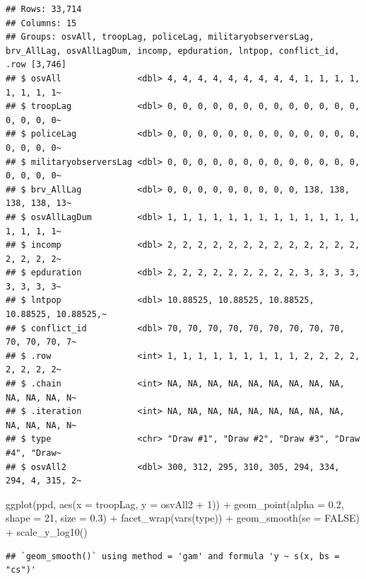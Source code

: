 \documentclass[
]{book}
\newenvironment{Shaded}{\begin{snugshade}}{\end{snugshade}}
\newcommand{\AttributeTok}[1]{\textcolor[rgb]{0.77,0.63,0.00}{#1}}
\newcommand{\ConstantTok}[1]{\textcolor[rgb]{0.00,0.00,0.00}{#1}}
\newcommand{\DecValTok}[1]{\textcolor[rgb]{0.00,0.00,0.81}{#1}}
\newcommand{\FloatTok}[1]{\textcolor[rgb]{0.00,0.00,0.81}{#1}}
\newcommand{\FunctionTok}[1]{\textcolor[rgb]{0.00,0.00,0.00}{#1}}
\newcommand{\NormalTok}[1]{#1}
\newcommand{\SpecialCharTok}[1]{\textcolor[rgb]{0.00,0.00,0.00}{#1}}
\begin{document}
\begin{verbatim}
## Rows: 33,714
## Columns: 15
## Groups: osvAll, troopLag, policeLag, militaryobserversLag, brv_AllLag, osvAllLagDum, incomp, epduration, lntpop, conflict_id, .row [3,746]
## $ osvAll               <dbl> 4, 4, 4, 4, 4, 4, 4, 4, 4, 1, 1, 1, 1, 1, 1, 1, 1~
## $ troopLag             <dbl> 0, 0, 0, 0, 0, 0, 0, 0, 0, 0, 0, 0, 0, 0, 0, 0, 0~
## $ policeLag            <dbl> 0, 0, 0, 0, 0, 0, 0, 0, 0, 0, 0, 0, 0, 0, 0, 0, 0~
## $ militaryobserversLag <dbl> 0, 0, 0, 0, 0, 0, 0, 0, 0, 0, 0, 0, 0, 0, 0, 0, 0~
## $ brv_AllLag           <dbl> 0, 0, 0, 0, 0, 0, 0, 0, 0, 138, 138, 138, 138, 13~
## $ osvAllLagDum         <dbl> 1, 1, 1, 1, 1, 1, 1, 1, 1, 1, 1, 1, 1, 1, 1, 1, 1~
## $ incomp               <dbl> 2, 2, 2, 2, 2, 2, 2, 2, 2, 2, 2, 2, 2, 2, 2, 2, 2~
## $ epduration           <dbl> 2, 2, 2, 2, 2, 2, 2, 2, 2, 3, 3, 3, 3, 3, 3, 3, 3~
## $ lntpop               <dbl> 10.88525, 10.88525, 10.88525, 10.88525, 10.88525,~
## $ conflict_id          <dbl> 70, 70, 70, 70, 70, 70, 70, 70, 70, 70, 70, 70, 7~
## $ .row                 <int> 1, 1, 1, 1, 1, 1, 1, 1, 1, 2, 2, 2, 2, 2, 2, 2, 2~
## $ .chain               <int> NA, NA, NA, NA, NA, NA, NA, NA, NA, NA, NA, NA, N~
## $ .iteration           <int> NA, NA, NA, NA, NA, NA, NA, NA, NA, NA, NA, NA, N~
## $ type                 <chr> "Draw #1", "Draw #2", "Draw #3", "Draw #4", "Draw~
## $ osvAll2              <dbl> 300, 312, 295, 310, 305, 294, 334, 294, 4, 315, 2~
\end{verbatim}

\begin{Shaded}
\begin{Highlighting}[]
\FunctionTok{ggplot}\NormalTok{(ppd, }\FunctionTok{aes}\NormalTok{(}\AttributeTok{x =}\NormalTok{ troopLag, }\AttributeTok{y =}\NormalTok{ osvAll2 }\SpecialCharTok{+} \DecValTok{1}\NormalTok{)) }\SpecialCharTok{+} 
  \FunctionTok{geom\_point}\NormalTok{(}\AttributeTok{alpha =} \FloatTok{0.2}\NormalTok{, }\AttributeTok{shape =} \DecValTok{21}\NormalTok{, }\AttributeTok{size =} \FloatTok{0.3}\NormalTok{) }\SpecialCharTok{+} 
  \FunctionTok{facet\_wrap}\NormalTok{(}\FunctionTok{vars}\NormalTok{(type)) }\SpecialCharTok{+} 
  \FunctionTok{geom\_smooth}\NormalTok{(}\AttributeTok{se =} \ConstantTok{FALSE}\NormalTok{) }\SpecialCharTok{+} 
  \FunctionTok{scale\_y\_log10}\NormalTok{()}
\end{Highlighting}
\end{Shaded}

\begin{verbatim}
## `geom_smooth()` using method = 'gam' and formula 'y ~ s(x, bs = "cs")'
\end{verbatim}
\end{document}
